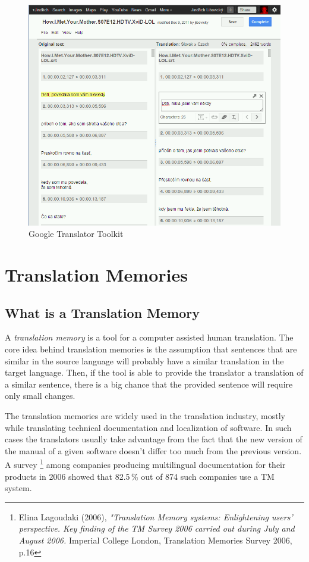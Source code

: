 \begin{figure}

\begin{center}
\includegraphics[scale=0.4]{./figures/google_translator_toolkit.png}
\end{center}

\caption{Google Translator Toolkit} \label{google_translator_toolkit}
\end{figure}

\section{Translation Memories}
\label{sec:translation_memories}
\subsection{What is a Translation Memory}

A \emph{translation memory} is a tool for a computer assisted human translation. The core idea behind translation memories is the assumption that sentences that are similar in the source language will probably have a similar translation in the target language. Then, if the tool is able to provide the translator a translation of a similar sentence, there is a big chance that the provided sentence will require only small changes.

The translation memories are widely used in the translation industry, mostly while translating technical documentation and localization of software. In such cases the translators usually take advantage from the fact that the new version of the manual of a given software doesn't differ too much from the previous version. A survey \footnote{Elina Lagoudaki (2006), \emph{"Translation Memory systems: Enlightening users' perspective. Key finding of the TM Survey 2006 carried out during July and August 2006.} Imperial College London, Translation Memories Survey 2006, p.16} among companies producing multilingual documentation for their products in 2006 showed that 82.5\,\% out of 874 such companies use a TM system.

